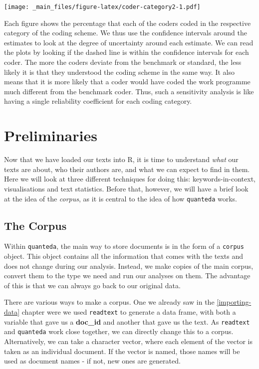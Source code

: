 \documentclass[
]{book}
\begin{document}
\texttt{[image: \_main\_files/figure-latex/coder-category2-1.pdf]}

Each figure shows the percentage that each of the coders coded in the respective category of the coding scheme. We thus use the confidence intervals around the estimates to look at the degree of uncertainty around each estimate. We can read the plots by looking if the dashed line is within the confidence intervals for each coder. The more the coders deviate from the benchmark or standard, the less likely it is that they understood the coding scheme in the same way. It also means that it is more likely that a coder would have coded the work programme much different from the benchmark coder. Thus, such a sensitivity analysis is like having a single reliability coefficient for each coding category.

\chapter{Preliminaries}\label{preliminaries}

Now that we have loaded our texts into R, it is time to understand \emph{what} our texts are about, who their authors are, and what we can expect to find in them. Here we will look at three different techniques for doing this: keywords-in-context, visualisations and text statistics. Before that, however, we will have a brief look at the idea of the \emph{corpus}, as it is central to the idea of how \texttt{quanteda} works.

\section{The Corpus}\label{the-corpus}

Within \texttt{quanteda}, the main way to store documents is in the form of a \texttt{corpus} object. This object contains all the information that comes with the texts and does not change during our analysis. Instead, we make copies of the main corpus, convert them to the type we need and run our analyses on them. The advantage of this is that we can always go back to our original data.

There are various ways to make a corpus. One we already saw in the \ref{importing-data} chapter were we used \texttt{readtext} to generate a data frame, with both a variable that gave us a \textbf{doc\_id} and another that gave us the text. As \texttt{readtext} and \texttt{quanteda} work close together, we can directly change this to a corpus. Alternatively, we can take a character vector, where each element of the vector is taken as an individual document. If the vector is named, those names will be used as document names - if not, new ones are generated.
\end{document}
